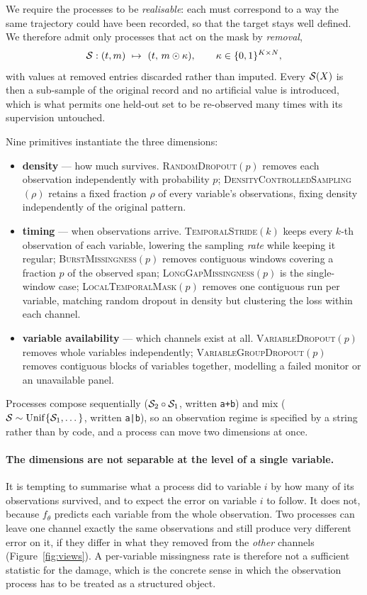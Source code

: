 We require the processes to be \emph{realisable}: each must correspond to a way the same trajectory could have
been recorded, so that the target stays well defined. We therefore admit only processes that act on the mask by
\emph{removal},
\begin{equation}
\mathcal{S}:(t,m)\ \mapsto\ (t,\,m\odot\kappa),\qquad \kappa\in\{0,1\}^{K\times N},
\end{equation}
with values at removed entries discarded rather than imputed. Every $\mathcal{S}(X)$ is then a sub-sample of the
original record and no artificial value is introduced, which is what permits one held-out set to be re-observed
many times with its supervision untouched.

Nine primitives instantiate the three dimensions:
\begin{itemize}
\item \textbf{density} --- how much survives. \textsc{RandomDropout}$(p)$ removes each observation independently
with probability $p$; \textsc{DensityControlledSampling}$(\rho)$ retains a fixed fraction $\rho$ of every
variable's observations, fixing density independently of the original pattern.
\item \textbf{timing} --- when observations arrive. \textsc{TemporalStride}$(k)$ keeps every $k$-th observation
of each variable, lowering the sampling \emph{rate} while keeping it regular; \textsc{BurstMissingness}$(p)$
removes contiguous windows covering a fraction $p$ of the observed span; \textsc{LongGapMissingness}$(p)$ is the
single-window case; \textsc{LocalTemporalMask}$(p)$ removes one contiguous run per variable, matching random
dropout in density but clustering the loss within each channel.
\item \textbf{variable availability} --- which channels exist at all. \textsc{VariableDropout}$(p)$ removes whole
variables independently; \textsc{VariableGroupDropout}$(p)$ removes contiguous blocks of variables together,
modelling a failed monitor or an unavailable panel.
\end{itemize}
Processes compose sequentially ($\mathcal{S}_2\circ\mathcal{S}_1$, written \texttt{a+b}) and mix
($\mathcal{S}\sim\mathrm{Unif}\{\mathcal{S}_1,\dots\}$, written \texttt{a|b}), so an observation regime is specified by a
string rather than by code, and a process can move two dimensions at once.

\paragraph{The dimensions are not separable at the level of a single variable.}
It is tempting to summarise what a process did to variable $i$ by how many of its observations survived, and to
expect the error on variable $i$ to follow. It does not, because $f_\theta$ predicts each variable from the whole
observation. Two processes can leave one channel exactly the same observations and still produce very different
error on it, if they differ in what they removed from the \emph{other} channels
(Figure~\ref{fig:views}). A per-variable missingness rate is therefore not a sufficient statistic for the damage,
which is the concrete sense in which the observation process has to be treated as a structured object.

